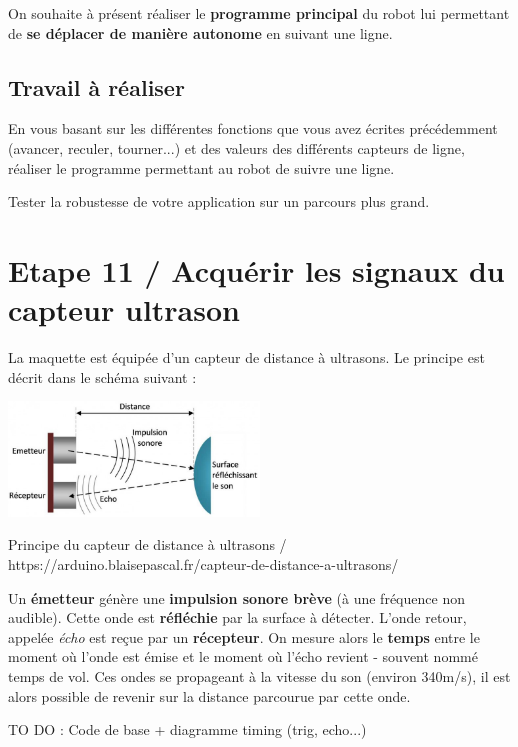 \documentclass[a4paper,11pt,titlepage]{article} %
\begin{document}
On souhaite à présent réaliser le \textbf{programme principal} du robot lui permettant de \textbf{se déplacer de manière autonome} en suivant une ligne.


\subsection{Travail à réaliser}

\Manip En vous basant sur les différentes fonctions que vous avez écrites précédemment (avancer, reculer, tourner...) et des valeurs des différents capteurs de ligne, réaliser le programme permettant au robot de suivre une ligne.

\Manip Tester la robustesse de votre application sur un parcours plus grand.

\section{Etape 11 / Acquérir les signaux du capteur ultrason}

La maquette est équipée d'un capteur de distance à ultrasons. Le principe est décrit dans le schéma suivant :

\begin{center}
	\includegraphics[width=0.5\textwidth]{images/Principe_Ultrasons_1_arduino.blaisepascal.fr.jpg}
	
	Principe du capteur de distance à ultrasons / https://arduino.blaisepascal.fr/capteur-de-distance-a-ultrasons/
\end{center}

Un \textbf{émetteur} génère une \textbf{impulsion sonore brève} (à une fréquence non audible). Cette onde est \textbf{réfléchie} par la surface à détecter. L'onde retour, appelée \textsl{écho} est reçue par un \textbf{récepteur}. On mesure alors le \textbf{temps} entre le moment où l'onde est émise et le moment où l'écho revient - souvent nommé temps de vol. Ces ondes se propageant à la vitesse du son (environ 340m/s), il est alors possible de revenir sur la distance parcourue par cette onde.

\newpage
 TO DO : Code de base + diagramme timing (trig, echo...)
 
\end{document}
